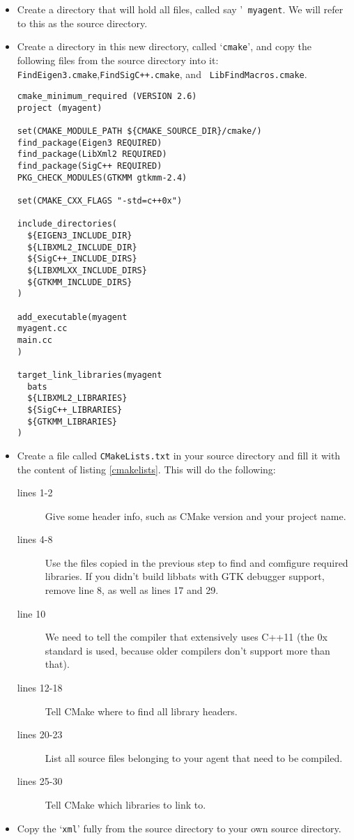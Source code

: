 \begin{itemize}
\item Create a directory that will hold all files, called say '{\tt
    myagent}. We will refer to this as the source directory.
\item Create a directory in this new directory, called `{\tt cmake}',
  and copy the following files from the \libbats source directory into
  it: {\tt FindEigen3.cmake},{\tt FindSigC++.cmake}, and {\tt
    LibFindMacros.cmake}.

\begin{lstlisting}[float,caption={\tt CMakeLists.txt},label=cmakelists,frame=single]
cmake_minimum_required (VERSION 2.6)
project (myagent)

set(CMAKE_MODULE_PATH ${CMAKE_SOURCE_DIR}/cmake/)
find_package(Eigen3 REQUIRED)
find_package(LibXml2 REQUIRED)
find_package(SigC++ REQUIRED)
PKG_CHECK_MODULES(GTKMM gtkmm-2.4)

set(CMAKE_CXX_FLAGS "-std=c++0x")

include_directories(
  ${EIGEN3_INCLUDE_DIR}
  ${LIBXML2_INCLUDE_DIR}
  ${SigC++_INCLUDE_DIRS}
  ${LIBXMLXX_INCLUDE_DIRS}
  ${GTKMM_INCLUDE_DIRS}
)

add_executable(myagent
myagent.cc
main.cc
)

target_link_libraries(myagent
  bats
  ${LIBXML2_LIBRARIES}
  ${SigC++_LIBRARIES}
  ${GTKMM_LIBRARIES}
)
\end{lstlisting}

\item Create a file called {\tt CMakeLists.txt} in your source
  directory and fill it with the content of listing \ref{cmakelists}. This will do the following:
  \begin{description}
  \item[lines 1-2] Give some header info, such as CMake version and your project name.
  \item[lines 4-8] Use the files copied in the previous step to find
    and comfigure required libraries. If you didn't build libbats with
    GTK debugger support, remove line 8, as well as lines 17 and 29.
  \item[line 10] We need to tell the compiler that \libbats
    extensively uses C++11 (the 0x standard is used, because older
    compilers don't support more than that).
  \item[lines 12-18] Tell CMake where to find all library headers.
  \item[lines 20-23] List all source files belonging to your agent
    that need to be compiled.
  \item[lines 25-30] Tell CMake which libraries to link to.
  \end{description}
\item Copy the `{\tt xml}' fully from the \libbats source directory to
  your own source directory.
\end{itemize}

